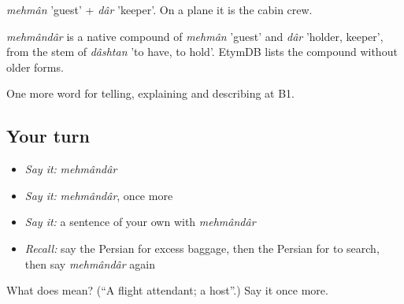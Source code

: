 \emph{mehmân} 'guest' + \emph{dâr} 'keeper'. On a plane it is the cabin crew.

\begin{cousinweb}
\emph{mehmândâr} is a native compound of \emph{mehmân} 'guest' and \emph{dâr} 'holder, keeper', from the stem of \emph{dâshtan} 'to have, to hold'. EtymDB lists the compound without older forms.
\end{cousinweb}

\begin{grammarlens}[title={What you've built}]
One more word for telling, explaining and describing at B1.
\end{grammarlens}

\subsection*{Your turn}
\begin{itemize}
\raggedright
  \item \emph{Say it:} \emph{mehmândâr}
  \item \emph{Say it:} \emph{mehmândâr}, once more
  \item \emph{Say it:} a sentence of your own with \emph{mehmândâr}
  \item \emph{Recall:} say the Persian for excess baggage, then the Persian for to search, then say \emph{mehmândâr} again
\end{itemize}

\begin{tcolorbox}[breakable,colback=teal!4,colframe=teal!35!black,title={Before you move on}]
What does  mean? (\textquotedblleft{}A flight attendant; a host\textquotedblright{}.) Say it once more.
\end{tcolorbox}
